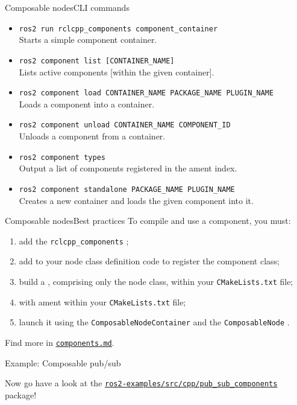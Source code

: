 \begin{frame}{Composable nodes}{CLI commands}
  \begin{itemize}
		\item \texttt{ros2 run rclcpp\_components component\_container}\\Starts a simple component container.
		\item \texttt{ros2 component list [CONTAINER\_NAME]}\\Lists active components [within the given container].
		\item \texttt{ros2 component load CONTAINER\_NAME PACKAGE\_NAME PLUGIN\_NAME}\\Loads a component into a container.
		\item \texttt{ros2 component unload CONTAINER\_NAME COMPONENT\_ID}\\Unloads a component from a container.
		\item \texttt{ros2 component types}\\Output a list of components registered in the ament index.
		\item \texttt{ros2 component standalone PACKAGE\_NAME PLUGIN\_NAME}\\Creates a new container and loads the given component into it.
	\end{itemize}
\end{frame}
\begin{frame}{Composable nodes}{Best practices}
  To compile and use a component, you must:
  \begin{enumerate}
    \item add the \texttt{rclcpp\_components} ;
    \item add  to your node class definition code to register the component class;
    \item build a , comprising only the node class, within your \texttt{CMakeLists.txt} file;
    \item {} with ament within your \texttt{CMakeLists.txt} file;
    \item launch it using the \texttt{ComposableNodeContainer}  and the \texttt{ComposableNode} .
  \end{enumerate}
  \begin{block}{}
		\centering
		Find more in \href{https://github.com/IntelligentSystemsLabUTV/ros2-examples/blob/jazzy/components.md}{\color{blue}\underline{\texttt{components.md}}}.
	\end{block}
\end{frame}

\begin{frame}{Example: Composable pub/sub}
  \begin{block}{}
    \centering
	  Now go have a look at the \href{https://github.com/IntelligentSystemsLabUTV/ros2-examples/tree/jazzy/src/cpp/pub_sub_components}{\color{blue}\underline{\texttt{ros2-examples/src/cpp/pub\_sub\_components}}} package!
  \end{block}
\end{frame}
